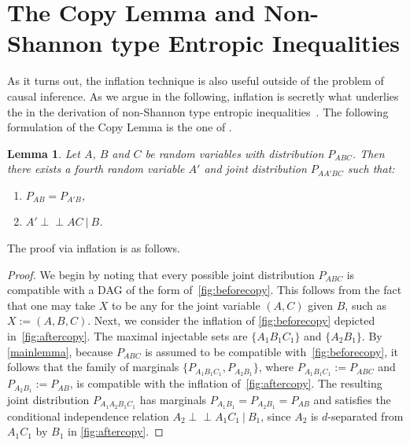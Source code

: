 \documentclass[aps,english,superscriptaddress,onecolumn,twoside,longbibliography,pra,floatfix,fleqn,nofootinbib]{revtex4-1}%
\newcommand*{\tblue}[1]{{\color{MidnightBlue}{\textbf{#1}}}}
\newtheorem{lemma}[theorem]{Lemma}
\theoremstyle{definition}
\newcommand{\indep}{\perp\!\!\!\!\perp} %
\begin{document}
\section{The Copy Lemma and Non-Shannon type Entropic Inequalities}\label{sec:NonShannon}

As it turns out, the inflation technique is also useful outside of the problem of causal inference. As we argue in the following, inflation is secretly what underlies the \tblue{Copy Lemma} in the derivation of non-Shannon type entropic inequalities~\cite[Chapter~15]{yeung_network_2008}. The following formulation of the Copy Lemma is the one of \citet{kaced_equivalence_2013}.

\begin{lemma}
	Let $A$, $B$ and $C$ be random variables with distribution $P_{ABC}$. Then there exists a fourth random variable $A'$ and joint distribution $P_{AA'BC}$ such that:
	\begin{enumerate}
		\item $P_{AB} = P_{A'B}$,
		\item $A' \indep AC \:|\: B$.
	\label{copylemma}
	\end{enumerate}
\end{lemma}

The proof via inflation is as follows.
\begin{proof}
	We begin by noting that every possible joint distribution $P_{ABC}$ is compatible with a DAG of the form of~\cref{fig:beforecopy}.  This follows from the fact that one may take $X$ to be any \tblue{sufficient statistic} for the joint variable $(A,C)$ given $B$, such as $X := (A,B,C)$.  Next, we consider the inflation of \cref{fig:beforecopy} depicted in~\cref{fig:aftercopy}. The maximal injectable sets are $\{ A_1 B_1 C_1\}$ and $\{A_2 B_1\}$.  By \cref{mainlemma}, because $P_{ABC}$ is assumed to be compatible with~\cref{fig:beforecopy}, it follows that the family of marginals $\{ P_{A_1 B_1 C_1}, P_{A_2 B_1}\}$, where $P_{A_1 B_1 C_1}:= P_{A B C}$ and $P_{A_2 B_1} := P_{AB}$, is compatible with the inflation of~\cref{fig:aftercopy}. The resulting joint distribution $P_{A_1 A_2 B_1 C_1}$ has marginals $P_{A_1 B_1}= P_{A_2 B_1} =P_{AB}$ and satisfies the conditional independence relation $A_2 \indep A_1 C_1 \:|\: B_1$, since $A_2$ is $d$-separated from $A_1 C_1$ by $B_1$ in \cref{fig:aftercopy}.
\end{proof}
\end{document}
